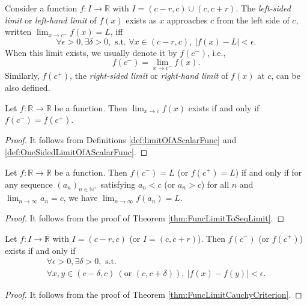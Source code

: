 \begin{defn}
  \label{def:OneSidedLimitOfAScalarFunc}
  Consider a function $f: I\rightarrow \mathbb{R}$
   with $I=(c-r,c)\cup (c,c+r)$.
  The \emph{left-sided limit} or \emph{left-hand limit} of $f(x)$ exists
   as $x$ approaches $c$ from the left side of $c$, written
     $\lim_{x\rightarrow c^{-}} f(x) = L$,
  iff 
  \begin{equation}
    \forall \epsilon>0, \exists \delta>0, \text{ s.t. }
    \forall x\in (c-r,c),\ |f(x)-L|<\epsilon.
  \end{equation}
  When this limit exists, we usually denote it by $f(c^{-})$, i.e.,
  \begin{displaymath}
    f(c^{-})=\lim_{x\rightarrow c^{-}}f(x).
  \end{displaymath}
  Similarly, $f(c^{+})$,
  the \emph{right-sided limit} or \emph{right-hand limit} of $f(x)$
  at $c$,
  can be also defined.
\end{defn}

\begin{thm}
  \label{thm:OneSidedLimitAndLimitExistence}
   Let $f: \mathbb{R}\rightarrow \mathbb{R}$ be a function.
   Then $\lim_{x\rightarrow c}f(x)$ exists if and only if
   $f(c^{-})=f(c^{+})$.
   \begin{proof}
     It follows from Definitions \ref{def:limitOfAScalarFunc}
     and \ref{def:OneSidedLimitOfAScalarFunc}.
   \end{proof}
\end{thm}

\begin{thm}
  \label{thm:FuncOneSidedLimitToSeqLimit}
  Let $f:\mathbb{R}\rightarrow \mathbb{R}$ be a function.
  Then $f(c^{-})=L$ (or $f(c^{+})=L$) if and only if
  for any sequence $(a_{n})_{n\in \mathbb{N}^{+}}$ satisfying
  $a_{n}< c$ (or $a_{n}>c$) for all $n$ and
  $\lim_{n\rightarrow\infty}a_{n}=c$, we have
  $\lim_{n\rightarrow \infty}f(a_{n})=L$.
\end{thm}
\begin{proof}
  It follows from the proof of Theorem \ref{thm:FuncLimitToSeqLimit}.
\end{proof}

\begin{thm}
  \label{thm:FuncOneSidedLimitCauchyCriterion}
  Let $f:I\rightarrow \mathbb{R}$ with $I=(c-r,c)$ (or $I=(c,c+r)$).
  Then $f(c^{-})$ (or $f(c^{+})$) exists if and only if
  \begin{equation}
    \begin{array}{l}
      \forall \epsilon>0, \exists \delta>0,\text{ s.t. }\\
      \forall x,y\in (c-\delta,c)\ 
      (\text{or } (c,c+\delta)),\ |f(x)-f(y)|<\epsilon.
    \end{array}
  \end{equation}
\end{thm}
\begin{proof}
  It follows from the proof of
  Theorem \ref{thm:FuncLimitCauchyCriterion}.
\end{proof}

